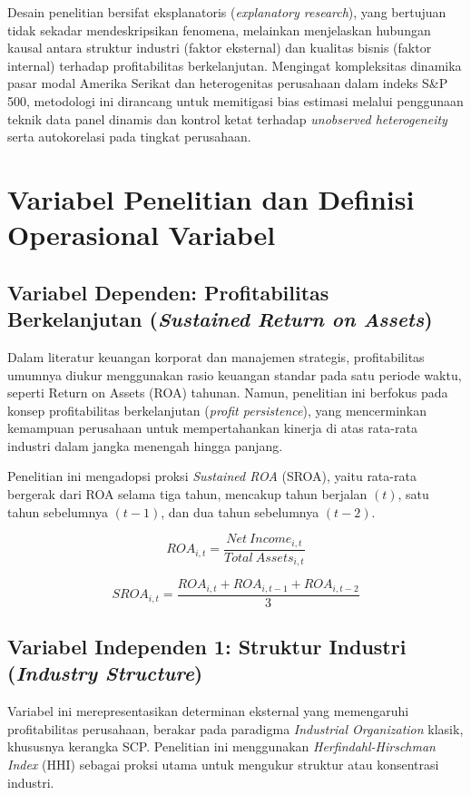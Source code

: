 \documentclass[12pt,a4paper]{report}
\begin{document}
Desain penelitian bersifat eksplanatoris (\textit{explanatory research}), yang bertujuan tidak sekadar mendeskripsikan fenomena, melainkan menjelaskan hubungan kausal antara struktur industri (faktor eksternal) dan kualitas bisnis (faktor internal) terhadap profitabilitas berkelanjutan. Mengingat kompleksitas dinamika pasar modal Amerika Serikat dan heterogenitas perusahaan dalam indeks S\&P 500, metodologi ini dirancang untuk memitigasi bias estimasi melalui penggunaan teknik data panel dinamis dan kontrol ketat terhadap \textit{unobserved heterogeneity} serta autokorelasi pada tingkat perusahaan.

\section{Variabel Penelitian dan Definisi Operasional Variabel}

\subsection{Variabel Dependen: Profitabilitas Berkelanjutan (\textit{Sustained Return on Assets})}

Dalam literatur keuangan korporat dan manajemen strategis, profitabilitas umumnya diukur menggunakan rasio keuangan standar pada satu periode waktu, seperti Return on Assets (ROA) tahunan. Namun, penelitian ini berfokus pada konsep profitabilitas berkelanjutan (\textit{profit persistence}), yang mencerminkan kemampuan perusahaan untuk mempertahankan kinerja di atas rata-rata industri dalam jangka menengah hingga panjang.

Penelitian ini mengadopsi proksi \textit{Sustained ROA} (SROA), yaitu rata-rata bergerak dari ROA selama tiga tahun, mencakup tahun berjalan $(t)$, satu tahun sebelumnya $(t-1)$, dan dua tahun sebelumnya $(t-2)$.

\[
ROA_{i,t} = \frac{Net\ Income_{i,t}}{Total\ Assets_{i,t}}
\]

\[
SROA_{i,t} = \frac{ROA_{i,t} + ROA_{i,t-1} + ROA_{i,t-2}}{3}
\]

\subsection{Variabel Independen 1: Struktur Industri (\textit{Industry Structure})}

Variabel ini merepresentasikan determinan eksternal yang memengaruhi profitabilitas perusahaan, berakar pada paradigma \textit{Industrial Organization} klasik, khususnya kerangka SCP. Penelitian ini menggunakan \textit{Herfindahl-Hirschman Index} (HHI) sebagai proksi utama untuk mengukur struktur atau konsentrasi industri.
\end{document}
